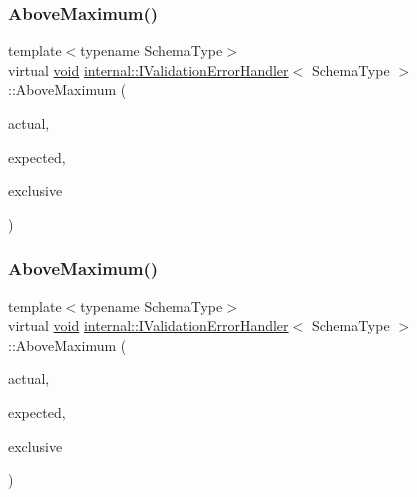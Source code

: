 \mbox{\label{classinternal_1_1IValidationErrorHandler_a78554707b14366d2ff7763290e1a6219}} 
\subsubsection{\texorpdfstring{Above\+Maximum()}{AboveMaximum()}\hspace{0.1cm}{\footnotesize\ttfamily [2/3]}}
{\footnotesize\ttfamily template$<$typename Schema\+Type$>$ \\
virtual \hyperlink{imgui__impl__opengl3__loader_8h_ac668e7cffd9e2e9cfee428b9b2f34fa7}{void} \hyperlink{classinternal_1_1IValidationErrorHandler}{internal\+::\+I\+Validation\+Error\+Handler}$<$ Schema\+Type $>$\+::Above\+Maximum (\begin{DoxyParamCaption}\item[{\hyperlink{stdint_8h_aec6fcb673ff035718c238c8c9d544c47}{uint64\+\_\+t}}]{actual,  }\item[{const \hyperlink{classinternal_1_1IValidationErrorHandler_a22eda6c4ea9537f1ba00d76af052649a}{S\+Value} \&}]{expected,  }\item[{bool}]{exclusive }\end{DoxyParamCaption})\hspace{0.3cm}{\ttfamily [pure virtual]}}

\mbox{\label{classinternal_1_1IValidationErrorHandler_a5b9e4690c26adbf4128b0b16f9e0625f}} 
\subsubsection{\texorpdfstring{Above\+Maximum()}{AboveMaximum()}\hspace{0.1cm}{\footnotesize\ttfamily [3/3]}}
{\footnotesize\ttfamily template$<$typename Schema\+Type$>$ \\
virtual \hyperlink{imgui__impl__opengl3__loader_8h_ac668e7cffd9e2e9cfee428b9b2f34fa7}{void} \hyperlink{classinternal_1_1IValidationErrorHandler}{internal\+::\+I\+Validation\+Error\+Handler}$<$ Schema\+Type $>$\+::Above\+Maximum (\begin{DoxyParamCaption}\item[{double}]{actual,  }\item[{const \hyperlink{classinternal_1_1IValidationErrorHandler_a22eda6c4ea9537f1ba00d76af052649a}{S\+Value} \&}]{expected,  }\item[{bool}]{exclusive }\end{DoxyParamCaption})\hspace{0.3cm}{\ttfamily [pure virtual]}}

